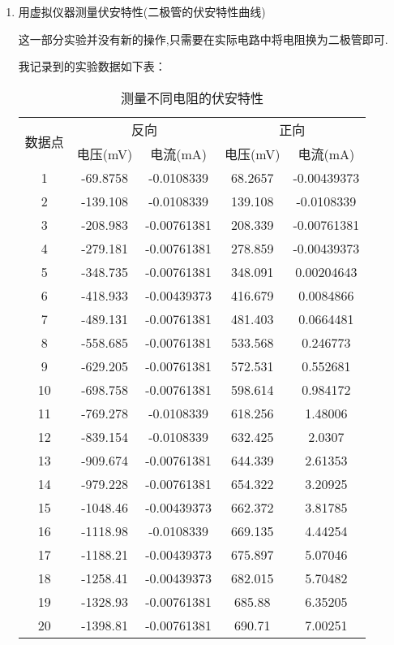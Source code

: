 \documentclass[11pt]{article}
\begin{document}
\begin{enumerate}
    \newpage

\item 用虚拟仪器测量伏安特性(二极管的伏安特性曲线)

   这一部分实验并没有新的操作,只需要在实际电路中将电阻换为二极管即可.
   
   我记录到的实验数据如下表：
\begin{table}[!ht]
    \centering
    \caption{测量不同电阻的伏安特性}
    \begin{tabular}{ccccc}
    \toprule
    \multirow{2}{*}{数据点} & \multicolumn{2}{c}{反向}&  \multicolumn{2}{c}{正向}\\
    \cmidrule{2-3}\cmidrule{4-5}
           & 电压(mV) & 电流(mA) & 电压(mV) & 电流(mA) \\ \hline
           1 & -69.8758 & -0.0108339 & 68.2657 & -0.00439373 \\ 
           2 & -139.108 & -0.0108339 & 139.108 & -0.0108339 \\ 
           3 & -208.983 & -0.00761381 & 208.339 & -0.00761381 \\ 
           4 & -279.181 & -0.00761381 & 278.859 & -0.00439373 \\ 
           5 & -348.735 & -0.00761381 & 348.091 & 0.00204643 \\ 
           6 & -418.933 & -0.00439373 & 416.679 & 0.0084866 \\ 
           7 & -489.131 & -0.00761381 & 481.403 & 0.0664481 \\ 
           8 & -558.685 & -0.00761381 & 533.568 & 0.246773 \\ 
           9 & -629.205 & -0.00761381 & 572.531 & 0.552681 \\ 
           10 & -698.758 & -0.00761381 & 598.614 & 0.984172 \\ 
           11 & -769.278 & -0.0108339 & 618.256 & 1.48006 \\ 
           12 & -839.154 & -0.0108339 & 632.425 & 2.0307 \\ 
           13 & -909.674 & -0.00761381 & 644.339 & 2.61353 \\ 
           14 & -979.228 & -0.00761381 & 654.322 & 3.20925 \\ 
           15 & -1048.46 & -0.00439373 & 662.372 & 3.81785 \\ 
           16 & -1118.98 & -0.0108339 & 669.135 & 4.44254 \\ 
           17 & -1188.21 & -0.00439373 & 675.897 & 5.07046 \\ 
           18 & -1258.41 & -0.00439373 & 682.015 & 5.70482 \\ 
           19 & -1328.93 & -0.00761381 & 685.88 & 6.35205 \\ 
           20 & -1398.81 & -0.00761381 & 690.71 & 7.00251 \\ 
        \bottomrule
    \end{tabular}
\end{table}


\end{enumerate}
\end{document}
